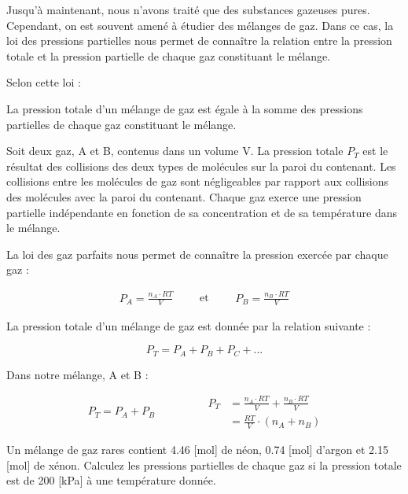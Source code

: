 \documentclass[
  11pt,
  a4paper,
  openany]{book}
\begin{document}
Jusqu'à maintenant, nous n'avons traité que des substances gazeuses pures. Cependant, on est souvent amené à étudier des mélanges de gaz. Dans ce cas, la loi des pressions partielles nous permet de connaître la relation entre la pression totale et la pression partielle de chaque gaz constituant le mélange.

Selon cette loi :

\begin{tcolorbox}
La pression totale d'un mélange de gaz est égale à la somme des pressions partielles de chaque gaz constituant le mélange.

\end{tcolorbox}

Soit deux gaz, A et B, contenus dans un volume V. La pression totale \(P_T\) est le résultat des collisions des deux types de molécules sur la paroi du contenant. Les collisions entre les molécules de gaz sont négligeables par rapport aux collisions des molécules avec la paroi du contenant. Chaque gaz exerce une pression partielle indépendante en fonction de sa concentration et de sa température dans le mélange.

La loi des gaz parfaits nous permet de connaître la pression exercée par chaque gaz :

\[
\begin{split}
  P_A = \frac{n_A \cdot RT }{V}
\end{split}
\qquad\text{et}\qquad
\begin{split}
  P_B = \frac{n_B \cdot RT }{V}
\end{split}
\]

La pression totale d'un mélange de gaz est donnée par la relation suivante :

\[
P_T = P_A + P_B + P_C + ...
\]

Dans notre mélange, A et B :

\[
\begin{split}
P_T = P_A + P_B
\end{split}
\qquad\qquad
\begin{split}
  P_T &= \frac{n_A \cdot RT }{V} + \frac{n_B \cdot RT }{V} \\
  &= \frac{RT }{V} \cdot (n_A + n_B)
\end{split}
\]

\begin{Exercise}

Un mélange de gaz rares contient 4.46 {[}mol{]} de néon, 0.74 {[}mol{]} d'argon et 2.15 {[}mol{]} de xénon. Calculez les pressions partielles de chaque gaz si la pression totale est de 200 {[}kPa{]} à une température donnée.


\end{Exercise}
\end{document}
